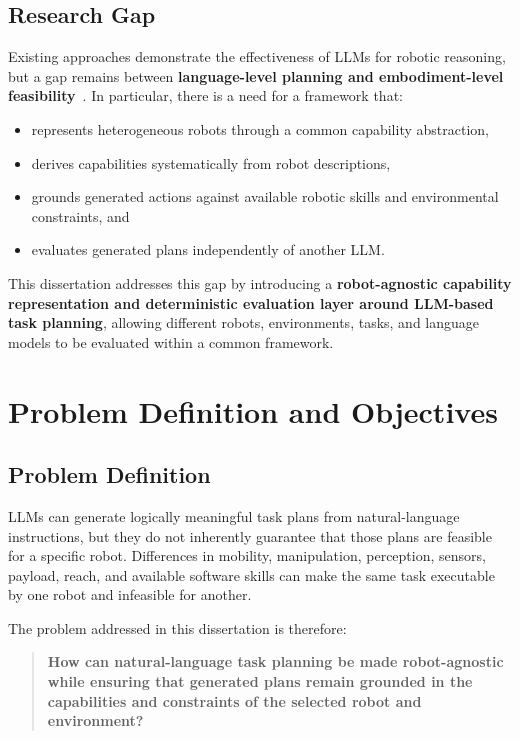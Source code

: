 \documentclass[12pt,a4paper]{article}
\begin{document}
\subsection{Research Gap}

Existing approaches demonstrate the effectiveness of LLMs for robotic reasoning, but a gap remains between \textbf{language-level planning and embodiment-level feasibility}~\cite{llm_survey}.
In particular, there is a need for a framework that:

\begin{itemize}
  \item represents heterogeneous robots through a common capability abstraction,
  \item derives capabilities systematically from robot descriptions,
  \item grounds generated actions against available robotic skills and environmental constraints, and
  \item evaluates generated plans independently of another LLM.
\end{itemize}

This dissertation addresses this gap by introducing a \textbf{robot-agnostic capability representation and deterministic evaluation layer around LLM-based task planning}, allowing different robots, environments, tasks, and language models to be evaluated within a common framework.

\section{Problem Definition and Objectives}

\subsection{Problem Definition}

LLMs can generate logically meaningful task plans from natural-language instructions, but they do not inherently guarantee that those plans are feasible for a specific robot.
Differences in mobility, manipulation, perception, sensors, payload, reach, and available software skills can make the same task executable by one robot and infeasible for another.

The problem addressed in this dissertation is therefore:

\begin{quote}
\textbf{How can natural-language task planning be made robot-agnostic while ensuring that generated plans remain grounded in the capabilities and constraints of the selected robot and environment?}
\end{quote}
\end{document}
